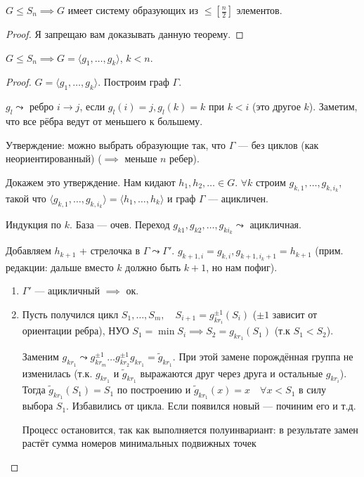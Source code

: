 \begin{theorem}
    $G \le S_n \implies G$ имеет систему образующих из $\le \left[ \frac{n}{2} \right]$ элементов.
\end{theorem}
\begin{proof}
    Я запрещаю вам доказывать данную теорему.
\end{proof}
\begin{theorem}
    $G \le S_n \implies G = \langle g_1, \ldots, g_k \rangle$, $k < n$.
\end{theorem}
\begin{proof}
    $G = \langle g_1, \ldots, g_k\rangle$. Построим граф $\Gamma$.

    $g_l \leadsto$ ребро  $i \to j$, если  $g_l(i) = j, g_l(k) = k$ при  $k < i$ (это другое $k$). Заметим, что все рёбра ведут от меньшего к большему.

    Утверждение: можно выбрать образующие так, что $\Gamma$ --- без циклов (как неориентированный) ($\implies$ меньше $n$ ребер).

    Докажем это утверждение. Нам кидают $h_1, h_2, \ldots \in G$. $\forall k$ строим  $g_{k,1}, \ldots, g_{k, i_k}$, такой что $\langle g_{k,1}, \ldots, g_{k, i_k} \rangle  = \langle h_1, \ldots, h_k \rangle$ и граф $\Gamma$ --- ацикличен.

    Индукция по $k$. База --- очев. Переход  $g_{k1}, g_{k 2}, \ldots, g_{k i_k} \leadsto$ ацикличная.

    Добавляем $h_{k+1}$ + стрелочка в  $\Gamma \leadsto \Gamma'$. $g_{k+1, i} = g_{k, i}, g_{k+1, i_k+1} = h_{k+1}$ (прим. редакции: дальше вместо $k$ должно быть $k+1$, но нам пофиг).
    \begin{enumerate}
        \item $\Gamma'$ --- ацикличный $\implies$ ок.

        \item
            Пусть получился цикл $S_1, \ldots, S_m, \quad S_{i+1} = g_{kr_i}^{\pm 1}(S_i)$ ($\pm 1$ зависит от ориентации ребра), НУО $S_1 = \min S_i \implies S_2 = g_{kr_1}(S_1)$ (т.к $S_1 < S_2$).

            Заменим $g_{kr_1} \leadsto g_{kr_m}^{\pm1} \ldots g_{kr_2}^{\pm1} g_{kr_1} = \widetilde{g}_{kr_1}$. При этой замене порождённая группа не изменилась (т.к. $g_{kr_1}$ и $\widetilde{g}_{kr_1}$ выражаются друг через друга и остальные $g_{kr_i}$). Тогда $\widetilde{g}_{kr_1}(S_1) = S_1$ по построению и $\widetilde{g}_{kr_1}(x) = x \quad \forall x < S_1$ в силу выбора $S_1$. Избавились от цикла. Если появился новый --- починим его и т.д.

            Процесс остановится, так как выполняется полуинвариант: в результате замен растёт сумма номеров минимальных подвижных точек
    \end{enumerate}
\end{proof}

